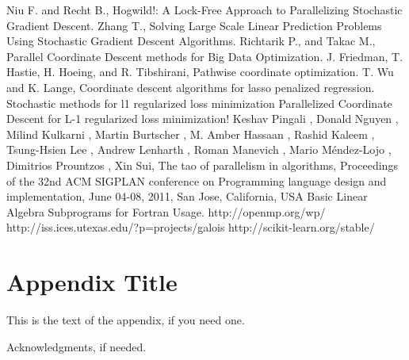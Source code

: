 \documentclass{sigplanconf}
\begin{document}


\begin{thebibliography}{}
\softraggedright

Niu F. and Recht B., Hogwild!: A Lock-Free Approach to Parallelizing Stochastic Gradient Descent.
Zhang T., Solving Large Scale Linear Prediction Problems Using Stochastic Gradient Descent Algorithms.
Richtarik P., and Takac M., Parallel Coordinate Descent methods for Big Data Optimization.
J. Friedman, T. Hastie, H. Hoeing, and R. Tibshirani, Pathwise coordinate optimization.
T. Wu and K. Lange, Coordinate descent algorithms for lasso penalized regression.
Stochastic methods for l1 regularized loss minimization
Parallelized Coordinate Descent for L-1 regularized loss minimization!
Keshav Pingali , Donald Nguyen , Milind Kulkarni , Martin Burtscher , M. Amber Hassaan , Rashid
Kaleem , Tsung-Hsien Lee , Andrew Lenharth , Roman Manevich , Mario Méndez-Lojo , Dimitrios
Prountzos , Xin Sui, The tao of parallelism in algorithms, Proceedings of the 32nd ACM SIGPLAN
conference on Programming language design and implementation, June 04-08, 2011, San Jose,
California, USA
Basic Linear Algebra Subprograms for Fortran Usage.
http://openmp.org/wp/
http://iss.ices.utexas.edu/?p=projects/galois
http://scikit-learn.org/stable/

\end{thebibliography}

\appendix

\section{Appendix Title}

This is the text of the appendix, if you need one.

\acks

Acknowledgments, if needed.
\end{document}

